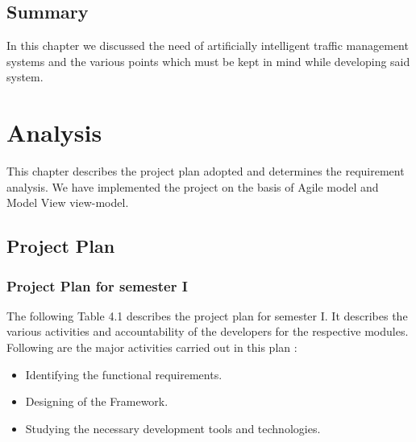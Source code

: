 \documentclass[openany,12pt]{report}
\begin{document}
\section{Summary}
\hspace*{0.5in}In this chapter we discussed the need of artificially intelligent traffic management systems and the various points which must be kept in mind while developing said system.\\


\chapter{Analysis}

\hspace*{0.5 in}This chapter describes the project plan adopted and determines the requirement analysis. We have implemented the project on the basis of Agile model and Model View view-model.


\section{Project Plan}

\subsection{Project Plan for semester I}

\hspace*{0.5 in}The following Table 4.1 describes the project plan for semester I. It describes the various activities and accountability of the developers for the respective modules. Following are the major activities carried out in this plan :
\begin{itemize}
\item{Identifying the functional requirements.}
\item{Designing of the Framework.}
\item{Studying the necessary development tools and technologies.}
\end{itemize}
\end{document}
